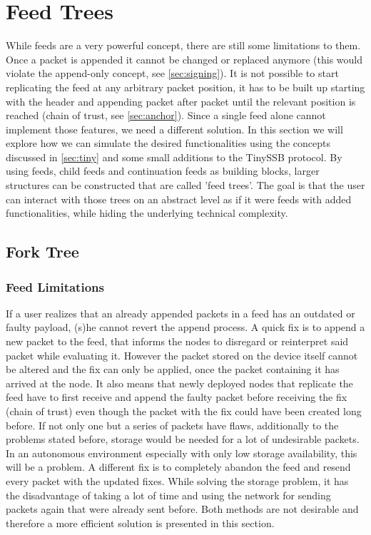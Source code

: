 \chapter{Feed Trees}

While feeds are a very powerful concept, there are still some limitations to them. Once a packet is appended it cannot be changed or replaced anymore (this would violate the append-only concept, see \cref{sec:signing}). It is not possible to start replicating the feed at any arbitrary packet position, it has to be built up starting with the header and appending packet after packet until the relevant position is reached (chain of trust, see \cref{sec:anchor}). Since a single feed alone cannot implement those features, we need a different solution. In this section we will explore how we can simulate the desired functionalities using the concepts discussed in \cref{sec:tiny} and some small additions to the TinySSB protocol. By using feeds, child feeds and continuation feeds as building blocks, larger structures can be constructed that are called 'feed trees'. The goal is that the user can interact with those trees on an abstract level as if it were feeds with added functionalities, while hiding the underlying technical complexity.

\section{Fork Tree}
\subsection{Feed Limitations}
If a user realizes that an already appended packets in a feed has an outdated or faulty payload, (s)he cannot revert the append process. A quick fix is to append a new packet to the feed, that informs the nodes to disregard or reinterpret said packet while evaluating it. However the packet stored on the device itself cannot be altered and the fix can only be applied, once the packet containing it has arrived at the node. It also means that newly deployed nodes that replicate the feed have to first receive and append the faulty packet before receiving the fix (chain of trust) even though the packet with the fix could have been created long before. If not only one but a series of packets have flaws, additionally to the problems stated before, storage would be needed for a lot of undesirable packets. In an autonomous environment especially with only low storage availability, this will be a problem. A different fix is to completely abandon the feed and resend every packet with the updated fixes. While solving the storage problem, it has the disadvantage of taking a lot of time and using the network for sending packets again that were already sent before. Both methods are not desirable and therefore a more efficient solution is presented in this section. 

